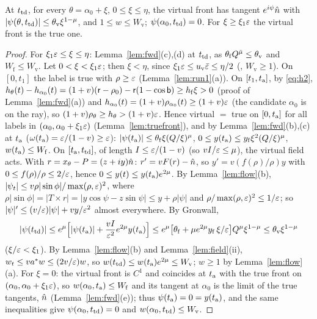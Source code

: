 \begin{lemma}\label{lem:virt}
At $t_{\mathrm{td}}$, for every $\theta=\alpha_0+\xi$, $0\le\xi\le\eta$, the virtual front has tangent $e^{i\psi}\hat n$ with
$|\psi(\theta,t_{\mathrm{td}})|\le\theta_{\mathrm v}\xi^{1-\mu}$, and $1\le w\le W_{\mathrm v}$; $\psi(\alpha_0,t_{\mathrm{td}})=0$. For $\xi\ge\xi_1\varepsilon$ the
virtual front is the true one.
\end{lemma}
\begin{proof}
For $\xi_1\varepsilon\le\xi\le\eta$: Lemma~\ref{lem:fwd}(c),(d) at $t_{\mathrm{td}}$, as $\theta_{\mathrm f}Q^{\bar\mu}\le\theta_{\mathrm v}$ and
$W_{\mathrm f}\le W_{\mathrm v}$. Let $0<\xi<\xi_1\varepsilon$; then $\xi<\eta$, since $\xi_1\varepsilon\le u_{\mathrm v}\bar\varepsilon\le\eta/2$ (,
$W_{\mathrm v}\ge1$). On $[0,t_1]$ the label is true with $\rho\ge\varepsilon$ (Lemma~\ref{lem:run1}(a)). On $[t_1,t_{\mathrm a}]$, by \eqref{eq:h2},
$h_\theta(t)-h_{\alpha_0}(t)=(1+v)(\mathsf r-\rho_0)-\mathsf r(1-\cos\mathsf b)\ge h_{\mathrm f}\xi>0$ (proof of Lemma~\ref{lem:fwd}(a)) and
$h_{\alpha_0}(t)=(1+v)\rho_{\alpha_0}(t)\ge(1+v)\varepsilon$ (the candidate $\alpha_0$ is on the ray), so $(1+v)\rho_\theta\ge h_\theta>(1+v)\varepsilon$.
Hence virtual $=$ true on $[0,t_{\mathrm a}]$ for all labels in $(\alpha_0,\alpha_0+\xi_1\varepsilon)$ (Lemma~\ref{lem:truefront}), and by
Lemma~\ref{lem:fwd}(b),(c) at $t_{\mathrm a}$ ($\omega(t_{\mathrm a})=\varepsilon/(1-v)\ge\varepsilon$):
$|\psi(t_{\mathrm a})|\le\theta_{\mathrm f}\xi(Q/\xi)^\mu$, $0\le y(t_{\mathrm a})\le y_{\mathrm f}\xi^2(Q/\xi)^\mu$, $w(t_{\mathrm a})\le W_{\mathrm f}$. On
$[t_{\mathrm a},t_{\mathrm{td}}]$, of length $I\le\varepsilon/(1-v)$ (so $vI/\varepsilon\le\mu$), the virtual field acts. With $r=x_\theta-P=(z+iy)\hat n$:
$r'=vF(r)-\hat n$, so $y'=v(f(\rho)/\rho)y$ with $0\le f(\rho)/\rho\le2/\varepsilon$, hence $0\le y(t)\le y(t_{\mathrm a})e^{2\mu}$. By
Lemma~\ref{lem:flow}(b), $|\psi_t|\le v\rho|\sin\phi|/\max(\rho,\varepsilon)^2$, where $\rho|\sin\phi|=|T\times r|=|y\cos\psi-z\sin\psi|\le y+\rho|\psi|$
and $\rho/\max(\rho,\varepsilon)^2\le1/\varepsilon$; so $|\psi|'\le(v/\varepsilon)|\psi|+vy/\varepsilon^2$ almost everywhere. By Gronwall,
\[
|\psi(t_{\mathrm{td}})|\le e^{\mu}\Bigl[|\psi(t_{\mathrm a})|+\frac{vI}{\varepsilon^2}e^{2\mu}y(t_{\mathrm a})\Bigr]\le e^\mu\bigl[\theta_{\mathrm f}+\mu e^{2\mu}y_{\mathrm f}\,\xi/\varepsilon\bigr]
Q^\mu\xi^{1-\mu}\le\theta_{\mathrm v}\xi^{1-\mu}
\]
($\xi/\varepsilon<\xi_1$). By Lemma~\ref{lem:flow}(b) and Lemma~\ref{lem:field}(ii), $w_t\le va^*w\le(2v/\varepsilon)w$, so
$w(t_{\mathrm{td}})\le w(t_{\mathrm a})e^{2\mu}\le W_{\mathrm v}$; $w\ge1$ by Lemma~\ref{lem:flow}(a). For $\xi=0$: the virtual front is $C^1$ and coincides
at $t_{\mathrm a}$ with the true front on $(\alpha_0,\alpha_0+\xi_1\varepsilon)$, so $w(\alpha_0,t_{\mathrm a})\le W_{\mathrm f}$ and its tangent at $\alpha_0$ is the
limit of the true tangents, $\hat n$ (Lemma~\ref{lem:fwd}(e)); thus $\psi(t_{\mathrm a})=0=y(t_{\mathrm a})$, and the same inequalities give $\psi(\alpha_0,t_{\mathrm{td}})=0$
and $w(\alpha_0,t_{\mathrm{td}})\le W_{\mathrm v}$.
\end{proof}
